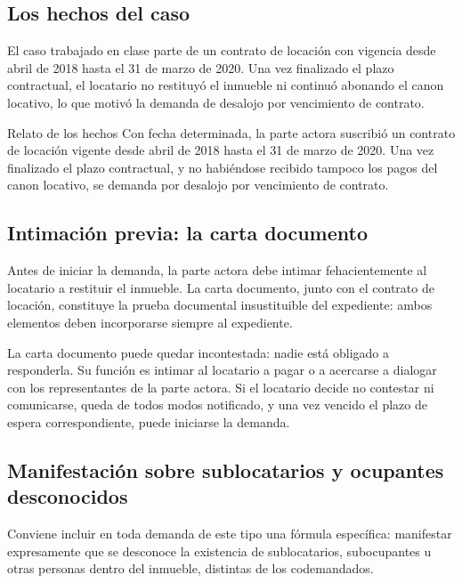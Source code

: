 \documentclass[12pt,oneside]{book}
\begin{document}
\subsection{Los hechos del caso}

El caso trabajado en clase parte de un contrato de locación con vigencia desde abril de 2018 hasta el 31 de marzo de 2020. Una vez finalizado el plazo contractual, el locatario no restituyó el inmueble ni continuó abonando el canon locativo, lo que motivó la demanda de desalojo por vencimiento de contrato.

\begin{example}{Relato de los hechos}
Con fecha determinada, la parte actora suscribió un contrato de locación vigente desde abril de 2018 hasta el 31 de marzo de 2020. Una vez finalizado el plazo contractual, y no habiéndose recibido tampoco los pagos del canon locativo, se demanda por desalojo por vencimiento de contrato.
\end{example}

\subsection{Intimación previa: la carta documento}

Antes de iniciar la demanda, la parte actora debe intimar fehacientemente al locatario a restituir el inmueble. La carta documento, junto con el contrato de locación, constituye la prueba documental insustituible del expediente: ambos elementos deben incorporarse siempre al expediente.

\begin{important}
La carta documento puede quedar incontestada: nadie está obligado a responderla. Su función es intimar al locatario a pagar o a acercarse a dialogar con los representantes de la parte actora. Si el locatario decide no contestar ni comunicarse, queda de todos modos notificado, y una vez vencido el plazo de espera correspondiente, puede iniciarse la demanda.
\end{important}

\subsection{Manifestación sobre sublocatarios y ocupantes desconocidos}

Conviene incluir en toda demanda de este tipo una fórmula específica: manifestar expresamente que se desconoce la existencia de sublocatarios, subocupantes u otras personas dentro del inmueble, distintas de los codemandados.
\end{document}
